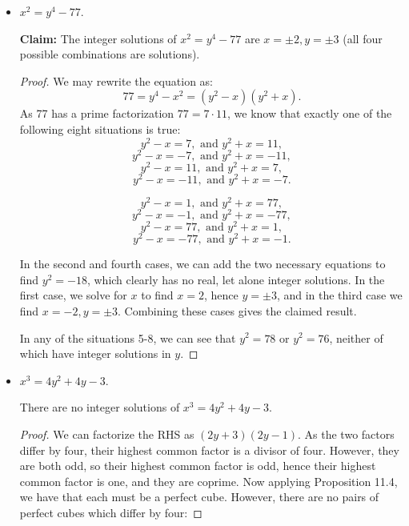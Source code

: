 \documentclass[11pt,dvipsnames]{book}
\numberwithin{equation}{section} %
\numberwithin{figure}{section} %
\numberwithin{table}{section} %
\begin{document}
\begin{exercise}
\begin{itemize}
\item $x^2=y^4-77$.



\begin{solution}

  {\bf Claim:} The integer solutions of $x^2=y^4-77$ are $x=\pm 2, y=\pm 3$ (all four possible combinations are solutions). 


\begin{proof}
 We may rewrite the equation as:
$$77=y^4-x^2 = (y^2-x)(y^2+x).$$
As 77 has a prime factorization $77=7\cdot 11$, we know that exactly one of the following eight situations is true:
$$y^2-x = 7, \textrm{ and } y^2+x=11,$$
$$y^2-x = -7, \textrm{ and } y^2+x=-11,$$
$$y^2-x = 11, \textrm{ and } y^2+x=7,$$
$$y^2-x = -11, \textrm{ and } y^2+x=-7.$$

$$y^2-x = 1, \textrm{ and } y^2+x=77,$$
$$y^2-x = -1, \textrm{ and } y^2+x=-77,$$
$$y^2-x = 77, \textrm{ and } y^2+x=1,$$
$$y^2-x = -77, \textrm{ and } y^2+x=-1.$$

In the second and fourth cases, we can add the two necessary equations to find $y^2=-18$, which clearly has no real, let alone integer solutions.  In the first case, we solve for $x$ to find $x=2$, hence $y=\pm 3$, and in the third case we find $x=-2, y=\pm3$.  Combining these cases gives the claimed result. 

In any of the situations 5-8, we can see that $y^2 = 78$ or $y^2=76$, neither of which have integer solutions in $y$.
\end{proof}

\end{solution}

\item $x^3=4y^2+4y-3$.

\begin{solution}
\begin{claim}
There are no integer solutions of $x^3=4y^2+4y-3$.
\end{claim}

\begin{proof}


 We can factorize the RHS as $(2y+3)(2y-1)$.  As the two factors differ by four, their highest common factor is a divisor of four.  However, they are both odd, so their highest common factor is odd, hence their highest common factor is one, and they are coprime.  Now applying Proposition 11.4, we have that each must be a perfect cube.  However, there are no pairs of perfect cubes which differ by four: 
 

\end{proof}
\end{solution}
\end{itemize}
\end{exercise}
\end{document}
